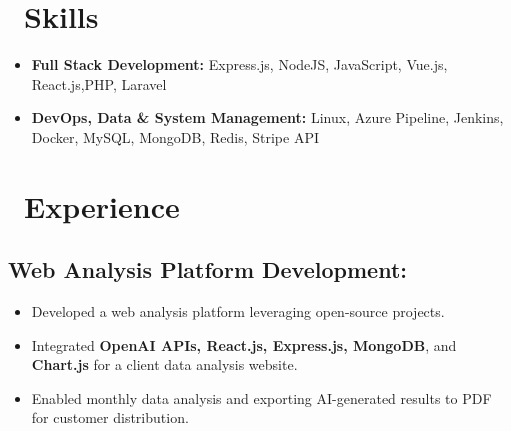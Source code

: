 \documentclass{resume}
\begin{document}



\section{\faCogs\ Skills}
\begin{itemize}[parsep=0.5ex]
  \item \textbf{Full Stack Development:} Express.js, NodeJS, JavaScript, Vue.js, React.js,PHP, Laravel
  \item \textbf{DevOps, Data \& System Management:} Linux, Azure Pipeline, Jenkins, Docker, MySQL, MongoDB, Redis, Stripe API
\end{itemize}

\section{\faUsers\ Experience}
{\small\subsection*{Web Analysis Platform Development:}}
\begin{itemize}[noitemsep]
    \item Developed a web analysis platform leveraging open-source projects.
    \item Integrated \textbf{OpenAI APIs, React.js, Express.js, MongoDB}, and \textbf{Chart.js} for a client data analysis website.
    \item Enabled monthly data analysis and exporting AI-generated results to PDF for customer distribution.
\end{itemize}
\end{document}
